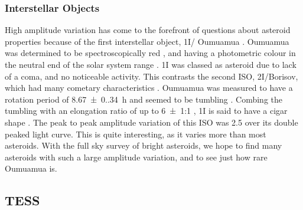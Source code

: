 \documentclass{UCreport}
\DeclareRobustCommand{\okina}{%
  \raisebox{\dimexpr\fontcharht\font`A-\height}{%
    \scalebox{0.8}{`}%
  }%
}
\newcommand{\omuamua}{\okina Oumuamua }
\begin{document}
\subsubsection*{Interstellar Objects}
High amplitude variation has come to the forefront of questions about asteroid properties because of the first interstellar object, 1I/\omuamua \citep[see][for a review]{Bannister2019}.
\omuamua was determined to be spectroscopically red \citep{Fitzsimmons2017, Meech2017}, and having a photometric colour in the neutral end of the solar system range \citep{Bannister2017}.
1I was classed as asteroid due to lack of a coma, and no noticeable activity.
This contrasts the second ISO, 2I/Borisov, which had many cometary characteristics \citep[see ][for a review]{Dorofeeva2023}. %
\omuamua was measured to have a rotation period of \qty{8.67(0.34)}{\hour} \citep{Belton2018} and seemed to be tumbling \citep[e.g.][]{Drahus2018,Fraser2018}.
Combing the tumbling with an elongation ratio of up to \qty{6(1)}{}:1 \citep{McNeill2018}, 1I is said to have a cigar shape \citep{Belton2018}.
The peak to peak amplitude variation of this ISO was \qty{2.5}{\mag} \citep{Meech2017} over its double peaked light curve.
This is quite interesting, as it varies more than most asteroids.
With the full sky survey of bright asteroids, we hope to find many asteroids with such a large amplitude variation, and to see just how rare \omuamua is.


\subsection{TESS}\label{SubSec:TESS}
\end{document}
